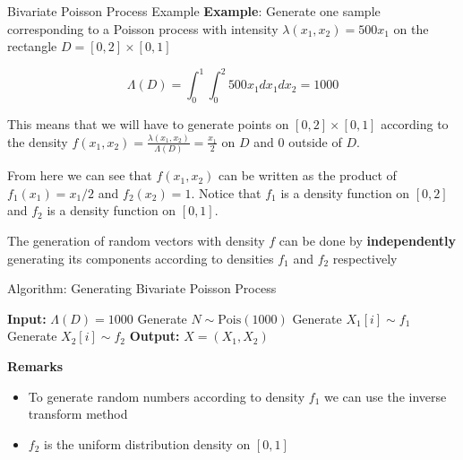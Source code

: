 \documentclass[8pt]{beamer}
\begin{document}
\begin{frame}{Bivariate Poisson Process Example}
\textbf{Example}: Generate one sample corresponding to a Poisson process with  intensity 
$\lambda(x_1,x_2)=500x_1$ on the rectangle $D=[0,2]\times[0,1]$

$$\displaystyle{\Lambda(D)=\int_0^1\int_0^2 500 x_1 dx_1 dx_2=1000}$$

This means that we will have to generate points on $[0,2]\times[0,1]$ according to the density $\displaystyle{f(x_1,x_2)=\frac{\lambda(x_1,x_2)}{\Lambda(D)}=\frac{x_1}{2}}$ on $D$ and 0 outside of $D$.

From here we can see that $f(x_1,x_2)$ can be written as the product of  $f_1(x_1)=x_1/2$ and $f_2(x_2)=1$. Notice that $f_1$ is a density function on $[0,2]$ and $f_2$ is a density function on $[0,1]$.

\vspace{2mm}

The generation of random vectors with density $f$ can be done by {\bf independently} generating its components according to densities $f_1$ and $f_2$ respectively
\end{frame}

\begin{frame}{Algorithm: Generating Bivariate Poisson Process}
\begin{algorithm}[H]
\caption{Generate Bivariate Poisson Process}
\begin{algorithmic}[1]
  \State \textbf{Input:} $\Lambda(D) = 1000$
  \State Generate $N \sim \text{Pois}(1000)$
    \State Generate $X_1[i] \sim f_1$
    \State Generate $X_2[i] \sim f_2$
  \EndFor
  \State \textbf{Output:} $X = (X_1, X_2)$
\end{algorithmic}
\end{algorithm}

\vspace{2mm}

\textbf{Remarks}
\begin{itemize}
	\item To generate random numbers according to density $f_1$ we can use the inverse transform method
	\item $f_2$ is the uniform distribution density on $[0,1]$
\end{itemize}
\end{frame}
\end{document}
